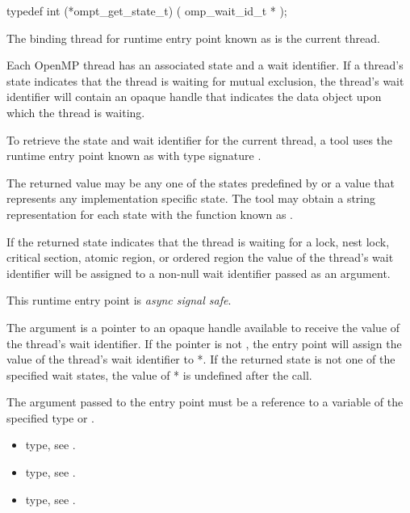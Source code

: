 \format
\begin{ccppspecific}
\begin{omptInquiry}
typedef int (*ompt_get_state_t) (
  omp_wait_id_t *
);
\end{omptInquiry}
\end{ccppspecific}

\binding

The binding thread for runtime entry point known as
 is the current thread.

\descr

Each OpenMP thread has an associated state and a wait identifier.  If
a thread's state indicates that the thread is waiting for mutual
exclusion, the thread's wait identifier will contain an opaque handle
that indicates the data object upon which the thread is waiting.

To retrieve the state and wait identifier for the current thread,
a tool uses the runtime entry point known as
 with type signature .

The returned value may be any one of the states predefined by
 or a value that represents any implementation
specific state.
The tool may obtain a string representation for each state with the
function known as .

If the returned state indicates that the thread is waiting for a
lock, nest lock, critical section, atomic region, or ordered region
the value of the thread's wait identifier will be assigned to a
non-null wait identifier passed as an argument.

This runtime entry point is \emph{async signal safe}.

\argdesc

The argument  is a pointer to an opaque handle
available to receive the value of the thread's wait identifier.  If
the  pointer is not , the entry point
will assign the value of the thread's wait identifier to
*.  If the returned state is not one of the specified
wait states, the value of * is undefined after the call.

\constraints
The argument passed to the entry point must be a reference
to a variable of the specified type or .

\crossreferences
\begin{itemize}
\item {} type, see .
\item {} type, see .
\item {} type, see .
\end{itemize}


